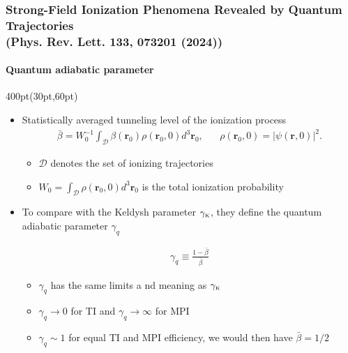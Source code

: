 \begin{frame}
\frametitle{Strong-Field Ionization Phenomena Revealed by Quantum Trajectories \\
\small (Phys. Rev. Lett. \textbf{133}, 073201 (2024))}
\framesubtitle{Quantum adiabatic parameter}

\small
\begin{textblock*}{400pt}(30pt,60pt)
\begin{itemize}
\footnotesize
\item Statistically averaged tunneling level of the ionization process
\begin{align}
\bar{\beta} = W_0^{-1} \int_{\mathcal D} \beta\left( \boldsymbol{r}_0\right)
\rho\left( \boldsymbol{r}_0,0\right)
d^3 \boldsymbol{r}_0, \hspace{20pt} 
\rho(\boldsymbol{r}_0,0) = \left| \psi(\boldsymbol{r},0) \right|^2. \nonumber
\end{align}
\begin{itemize}
\footnotesize
\item[$\bullet$] $\mathcal{D}$ denotes the set of ionizing trajectories
\item[$\bullet$] $W_0 = \int_{\mathcal D} \rho\left(\boldsymbol{r}_0,0\right)d^3\boldsymbol{r}_0$ is the total ionization probability
\end{itemize}

\vspace{10pt}

\item To compare with the Keldysh parameter $\gamma_{\mbox{\tiny$\rm K$}}$, they define 
the quantum adiabatic parameter $\gamma_q$

\begin{align}
\gamma_q \equiv \frac{1-\bar{\beta}}{\bar{\beta}}  \nonumber
\end{align}
\begin{itemize}
\footnotesize
\item[$\bullet$] $\gamma_q$ has the same limits a
nd meaning as $\gamma_{\mbox{\tiny$\rm K$}}$
\item[$\bullet$] $\gamma_q \longrightarrow 0$ for TI and
$\gamma_q \longrightarrow \infty$ for MPI
\item[$\bullet$] $\gamma_q \sim 1$ for equal TI and MPI efficiency, 
we would then have $\bar{\beta} = 1/2$
\end{itemize}
\end{itemize}

\end{textblock*}

\end{frame}


